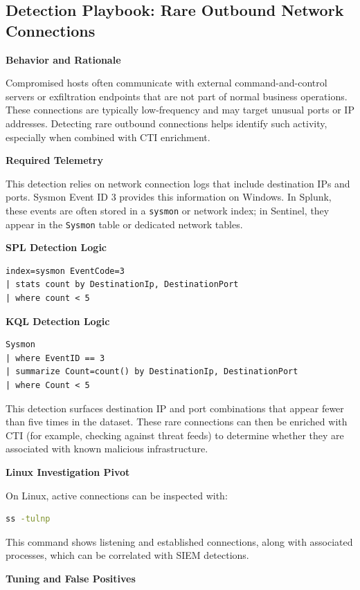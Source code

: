 \subsection*{Detection Playbook: Rare Outbound Network Connections}

\textbf{Behavior and Rationale}

Compromised hosts often communicate with external command-and-control servers or exfiltration endpoints that are not part of normal business operations. These connections are typically low-frequency and may target unusual ports or IP addresses. Detecting rare outbound connections helps identify such activity, especially when combined with CTI enrichment.

\textbf{Required Telemetry}

This detection relies on network connection logs that include destination IPs and ports. Sysmon Event ID 3 provides this information on Windows. In Splunk, these events are often stored in a \texttt{sysmon} or network index; in Sentinel, they appear in the \texttt{Sysmon} table or dedicated network tables.

\textbf{SPL Detection Logic}
\begin{lstlisting}
index=sysmon EventCode=3
| stats count by DestinationIp, DestinationPort
| where count < 5
\end{lstlisting}

\textbf{KQL Detection Logic}
\begin{lstlisting}
Sysmon
| where EventID == 3
| summarize Count=count() by DestinationIp, DestinationPort
| where Count < 5
\end{lstlisting}

This detection surfaces destination IP and port combinations that appear fewer than five times in the dataset. These rare connections can then be enriched with CTI (for example, checking against threat feeds) to determine whether they are associated with known malicious infrastructure.

\textbf{Linux Investigation Pivot}

On Linux, active connections can be inspected with:

\begin{lstlisting}[language=bash]
ss -tulnp
\end{lstlisting}

This command shows listening and established connections, along with associated processes, which can be correlated with SIEM detections.

\textbf{Tuning and False Positives}

